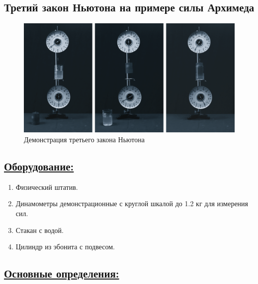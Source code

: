 \documentclass[14pt,a4paper,oneside]{extarticle}	%
\begin{document}

\newpage
\begin{center}
	\subsection*{Третий закон Ньютона на примере силы Архимеда}
\end{center}

\begin{figure}[H]
	\centering 		
	\includegraphics[width=1\linewidth]{newton-3.png} 
	\caption{Демонстрация третьего закона Ньютона}
	\label{newton-3}
\end{figure}

\subsection*{\underline{Оборудование:}}

\begin{enumerate}
	\item Физический штатив.
	\item Динамометры демонстрационные с круглой шкалой до 1.2 кг для измерения сил.
	\item Стакан с водой.
	\item Цилиндр из эбонита с подвесом.
\end{enumerate}

\newpage
\subsection*{\underline{Основные определения:}}
\end{document}

